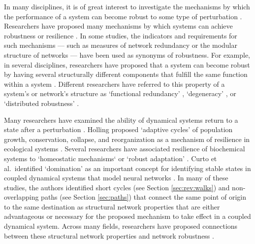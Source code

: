 \documentclass{comnet-mod}
\begin{document}
In many disciplines, it is of great interest to investigate the mechanisms by which the performance of a system can become robust to some type of perturbation \cite{Kitano2004, Stelling2004}. Researchers have proposed many mechanisms by which systems can achieve robustness or resilience \cite{Edelman2001, Kitano2004, Stelling2004, Masel2009, Araujo2018, Jeynes-Smith2024}. In some studies, the indicators and requirements for such mechanisms --- such as measures of network redundancy \cite{Krakauer2002, Little2003, Kitano2004, Stelling2004, Wagner2005} or the modular structure of networks \cite{Simon1991, Kitano2004, Stelling2004, Ma2006, Wang2012} --- have been used as synonyms of robustness. For example, in several disciplines, researchers have proposed that a system can become robust by having several structurally different components that fulfill the same function within a system \cite{Lawton1994, Tononi1999, Wagner2005, Macia2008, Whitacre2010, Whitacre2010a}. Different researchers have referred to this property of a system's or network's structure as `functional redundancy' \cite{Lawton1994, Rosenfeld2002, Loreau2004}, `degeneracy' \cite{Tononi1999, Whitacre2010}, or `distributed robustness' \cite{Wagner2005, Macia2008, Whitacre2010a}. 

Many researchers have examined the ability of dynamical systems return to a state after a perturbation \cite{Golubitsky2009, Ma2009, Ferrell2016, Reed2017, Antoneli2018, Araujo2018, Curto2019, golubitsky2023, Krakovska2024, Jeynes-Smith2024}. Holling proposed `adaptive cycles' of population growth, conservation, collapse, and reorganization as a mechanism of resilience in ecological systems \cite{Holling1985, Burkhard2011}. Several researchers have associated resilience of biochemical systems to  `homeostatic mechanisms` \cite{Reed2017, Antoneli2018} or `robust adaptation' \cite{Ma2009, Ferrell2016, Araujo2018, Jeynes-Smith2024}. Curto et al.~identified `domination' as an important concept for identifying stable states in coupled dynamical systems that model neural networks \cite{Curto2019}. In many of these studies, the authors identified short cycles (see Section \ref{sec:rev:walks}) and non-overlapping paths (see Section \ref{sec:paths}) that connect the same point of origin to the same destination as structural network properties that are either advantageous or necessary for the proposed mechanism to take effect in a coupled dynamical system\cite{Ma2009, Ferrell2016, Reed2017, Antoneli2018, Araujo2018, Curto2019, Jeynes-Smith2024}. Across many fields, researchers have proposed connections between these structural network properties and network robustness \cite{Wagner2005, Randles2011, Braunstein2016, Radicchi2017, Ozel2018, Xu2021, Yazdani2011}.
\end{document}
